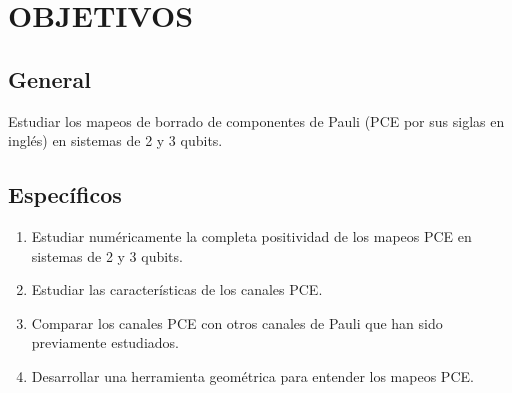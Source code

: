 \chapter{OBJETIVOS}

\section*{General}
Estudiar los mapeos de borrado de componentes de Pauli (PCE por
sus siglas en inglés) en sistemas de 2 y 3 qubits.


\section*{Específicos}

\begin{enumerate}
\item Estudiar numéricamente la completa positividad de los mapeos 
PCE en sistemas de 2 y 3 qubits.

\item Estudiar las características de los canales PCE.

\item Comparar los canales PCE con otros canales de Pauli que han 
sido previamente estudiados.

\item Desarrollar una herramienta geométrica para entender los 
mapeos PCE.
\end{enumerate}

